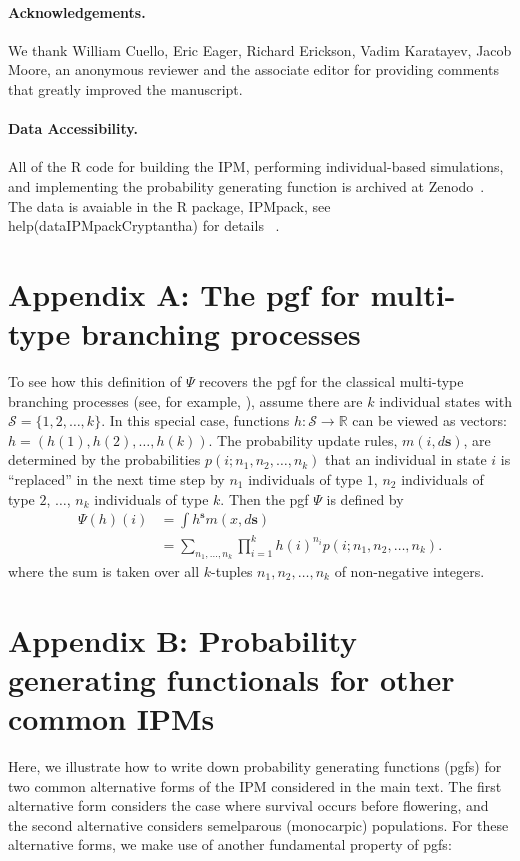\documentclass[12pt]{amsart}\usepackage[]{graphicx}\usepackage[]{color}
\def\R{\mathbb R}
\def\S{\mathcal S}
\def\s{\mathbf s}
\begin{document}
\vskip 0.1in
\paragraph{\bf Acknowledgements.} We thank William Cuello, Eric Eager, Richard Erickson, Vadim Karatayev, Jacob Moore, an anonymous reviewer and the associate editor for providing comments that greatly improved the manuscript.
\vskip 0.1in 
\paragraph{\bf Data Accessibility.} 
All of the R code for building the IPM, performing individual-based simulations, and implementing the probability generating function is archived at Zenodo~\citep{schreiber-ross-ibipm-code-2015}. The data is avaiable in the R package, IPMpack,  see help(dataIPMpackCryptantha) for details ~\citep{IPMpack}.


\newpage
\section*{Appendix A: The pgf for multi-type branching processes}
To see how this definition of $\Psi$ recovers the pgf for the classical multi-type branching processes (see, for example, \citet{caswell-01}),  assume there are $k$ individual states with $\S=\{1,2,\dots,k\}$. In this special case, functions $h:\S\to \R$ can be viewed as vectors: $h=(h(1),h(2),\dots,h(k))$. The probability update rules, $m(i,d\s)$, are determined by the probabilities $p(i;n_1,n_2,\dots,n_k)$ that an individual in state $i$ is ``replaced'' in the next time step by  $n_1$ individuals of type $1$, $n_2$ individuals of type $2$, $\dots$, $n_k$ individuals of type $k$. Then the pgf $\Psi$ is defined by
\[
\begin{aligned}
\Psi(h)(i)&=\int h^\s m(x,d\s)\\
&= \sum_{n_1,\dots,n_k} \prod_{i=1}^k h(i)^{n_i} p(i;n_1,n_2,\dots,n_k).
\end{aligned}
\]
where the sum is taken over all $k$-tuples $n_1,n_2,\dots,n_k$ of non-negative integers.
\newpage

\section*{Appendix B: Probability generating functionals for other common IPMs}
Here, we illustrate how to write down probability generating functions (pgfs) for two common alternative forms of the IPM considered in the main text. The first alternative form considers the case where survival occurs before flowering, and the second alternative considers semelparous (monocarpic) populations. For these alternative forms, we make use of another fundamental property of pgfs:
\vskip 0.1in
\vskip 0.1in
\end{document}

